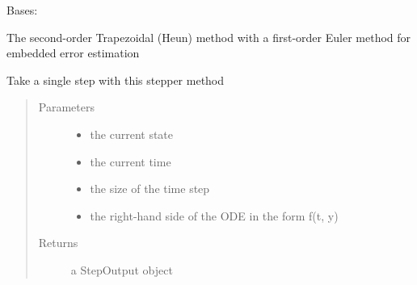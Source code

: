 \documentclass[letterpaper,10pt,english]{sphinxmanual}
\begin{document}
\begin{fulllineitems}
\label{\detokenize{spitfire.time.methods:spitfire.time.methods.AdaptiveERK21HeunEuler}}
Bases: {\hyperref[\detokenize{spitfire.time.methods:spitfire.time.methods.AdaptiveExplicitRungeKutta}]{}}

The second-order Trapezoidal (Heun) method with a first-order Euler method for embedded error estimation

\begin{fulllineitems}
\label{\detokenize{spitfire.time.methods:spitfire.time.methods.AdaptiveERK21HeunEuler.single_step}}
Take a single step with this stepper method
\begin{quote}\begin{description}
\item[{Parameters}] \leavevmode\begin{itemize}
\item {} 
 \textendash{} the current state

\item {} 
 \textendash{} the current time

\item {} 
 \textendash{} the size of the time step

\item {} 
 \textendash{} the right-hand side of the ODE in the form f(t, y)

\end{itemize}

\item[{Returns}] \leavevmode
a StepOutput object

\end{description}\end{quote}

\end{fulllineitems}


\end{fulllineitems}
\end{document}
